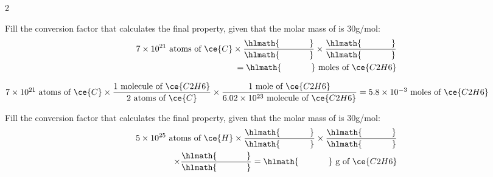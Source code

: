 \documentclass[main.tex]{subfiles}
\begin{document}
\begin{multicols*}{2}
\begin{question}[ID=\the\value{numA}]
Fill the conversion factor that calculates the final property, given that the molar mass of  is 30g/mol:
 \begin{equation*}\begin{split}
7\times 10^{21} \text{ atoms of }\ce{C}
\times 
\dfrac{\hlmath   {\hspace{35pt}}  }
{\hlmath{\hspace{35pt}}     }
\times
\dfrac{\hlmath{\hspace{35pt}}}
{\hlmath{\hspace{35pt}}} \\
=\hlmath{\hspace{35pt}}   \text{ moles of }\ce{C2H6}
\end{split}\end{equation*}
\end{question}
\begin{solution}
$
7\times 10^{21} \text{ atoms of }\ce{C}
\times 
\dfrac{ 1 \text{ molecule of }\ce{C2H6}     }
{  2\text{ atoms of }\ce{C}    }
\times
\dfrac{  1 \text{ mole of }\ce{C2H6}      }
{6.02\times 10^{23} \text{ molecule of }\ce{C2H6}  }  
= 5.8\times 10^{-3}   \text{ moles of }\ce{C2H6}
$
\hspace{0.1cm}\end{solution}%
\begin{question}[ID=\the\value{numA}]
Fill the conversion factor that calculates the final property, given that the molar mass of  is 30g/mol:
 \begin{equation*}\begin{split}
5\times 10^{25} \text{ atoms of }\ce{H}
\times 
\dfrac{\hlmath   {\hspace{35pt}}  }
{\hlmath{\hspace{35pt}}     }
\times
\dfrac{\hlmath{\hspace{35pt}}}
{\hlmath{\hspace{35pt}}} \\
\times
\dfrac{\hlmath{\hspace{35pt}}}
{\hlmath{\hspace{35pt}}}
=\hlmath{\hspace{35pt}}   \text{ g of }\ce{C2H6}
\end{split}\end{equation*}
\end{question}

\end{multicols*}
\end{document}
